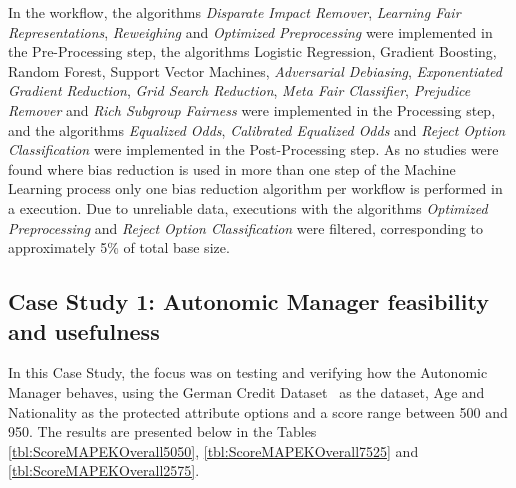 \documentclass[10pt,conference]{IEEEtran}
\begin{document}
In the workflow, the algorithms \textit{Disparate Impact Remover}, \textit{Learning Fair Representations}, \textit{Reweighing} and \textit{Optimized Preprocessing} were implemented in the Pre-Processing step, the algorithms Logistic Regression, Gradient Boosting, Random Forest, Support Vector Machines, \textit{Adversarial Debiasing}, \textit{Exponentiated Gradient Reduction}, \textit{Grid Search Reduction}, \textit{Meta Fair Classifier}, \textit{Prejudice Remover} and \textit{Rich Subgroup Fairness} were implemented in the Processing step, and the algorithms \textit{Equalized Odds}, \textit{Calibrated Equalized Odds} and \textit{Reject Option Classification} were implemented in the Post-Processing step. As no studies were found where bias reduction is used in more than one step of the Machine Learning process only one bias reduction algorithm per workflow is performed in a execution. Due to unreliable data, executions with the algorithms \textit{Optimized Preprocessing} and \textit{Reject Option Classification} were filtered, corresponding to approximately 5\% of total base size.

\subsection{Case Study 1: Autonomic Manager feasibility and usefulness}

In this Case Study, the focus was on testing and verifying how the Autonomic Manager behaves, using the German Credit Dataset~\citep{ucigerman_2021} as the dataset, Age and Nationality as the protected attribute options and a score range between 500 and 950. The results are presented below in the Tables \ref{tbl:ScoreMAPEKOverall5050}, \ref{tbl:ScoreMAPEKOverall7525} and \ref{tbl:ScoreMAPEKOverall2575}.
\end{document}
